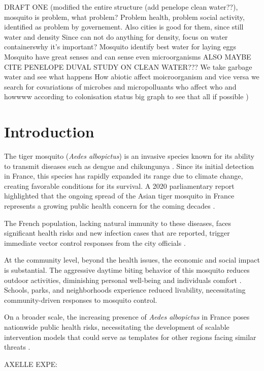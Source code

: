 DRAFT ONE (modified the entire structure (add penelope clean water??), mosquito is problem, what problem? Problem health, problem social activity, identified as problem by governement.
Also cities is good for them, since still water and density
Since can not do anything for density, focus on water containerswhy it's important?
Mosquito identify best water for laying eggs
Mosquito have great senses and can sense even microorganisms
ALSO MAYBE CITE PENELOPE DUVAL STUDY ON CLEAN WATER???
We take garbage water and see what happens
How abiotic affect moicroorganism and vice versa
we search for covariations of microbes and micropolluants
who affect who and howwww according to colonisation status
big graph to see that all if possible
)

\section{Introduction}
The tiger mosquito (\textit{Aedes albopictus}) is an invasive species known for its ability to transmit diseases such as dengue and chikungunya \cite{BONIZZONI2013460}. Since its initial detection in France, this species has rapidly expanded its range due to climate change, creating favorable conditions for its survival. 
A 2020 parliamentary report highlighted that the ongoing spread of the Asian tiger mosquito in France represents a growing public health concern for the coming decades \cite{naillet2020rapport}.

The French population, lacking natural immunity to these diseases, faces significant health risks and new infection cases that are reported, trigger immediate vector control responses from the city officials \cite{dengue_lyon}. 


At the community level, beyond the health issues, the economic and social impact is substantial. The aggressive daytime biting behavior of this mosquito reduces outdoor activities, diminishing personal well-being and individuals comfort \cite{haderer:hal-00783873}. Schools, parks, and neighborhoods experience reduced livability, necessitating community-driven responses to mosquito control.

On a broader scale, the increasing presence of \textit{Aedes albopictus} in France poses nationwide public health risks, necessitating the development of scalable intervention models that could serve as templates for other regions facing similar threats \cite{article}.



AXELLE EXPE:

